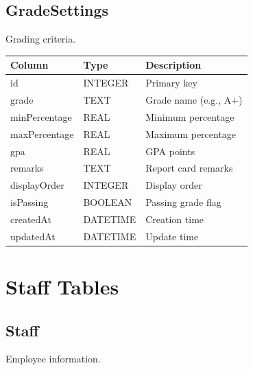 \documentclass[12pt,a4paper]{report}
\begin{document}
\section{GradeSettings}

Grading criteria.

\begin{longtable}{@{}p{4cm}p{2.5cm}p{6.5cm}@{}}
\toprule
\textbf{Column} & \textbf{Type} & \textbf{Description} \\
\midrule
\endhead
id & INTEGER & Primary key \\
grade & TEXT & Grade name (e.g., A+) \\
minPercentage & REAL & Minimum percentage \\
maxPercentage & REAL & Maximum percentage \\
gpa & REAL & GPA points \\
remarks & TEXT & Report card remarks \\
displayOrder & INTEGER & Display order \\
isPassing & BOOLEAN & Passing grade flag \\
createdAt & DATETIME & Creation time \\
updatedAt & DATETIME & Update time \\
\bottomrule
\end{longtable}

\chapter{Staff Tables}

\section{Staff}

Employee information.
\end{document}

